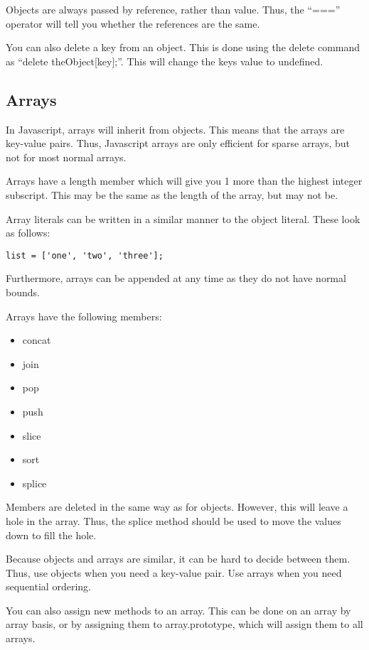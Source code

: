 			Objects are always passed by reference, rather than value. 
			Thus, the ``==='' operator will tell you whether the references are the same. 

			You can also delete a key from an object. 
			This is done using the delete command as ``delete theObject[key];''. 
			This will change the keys value to undefined. 
		\subsection{Arrays}
			In Javascript, arrays will inherit from objects. 
			This means that the arrays are key-value pairs. 
			Thus, Javascript arrays are only efficient for sparse arrays, but not for most normal arrays. 

			Arrays have a length member which will give you 1 more than the highest integer subscript. 
			This may be the same as the length of the array, but may not be. 

			Array literals can be written in a similar manner to the object literal. 
			These look as follows:
			\begin{verbatim}
list = ['one', 'two', 'three'];
			\end{verbatim}
			Furthermore, arrays can be appended at any time as they do not have normal bounds. 

			Arrays have the following members:
			\begin{itemize}
				\item concat
				\item join
				\item pop
				\item push 
				\item slice
				\item sort
				\item splice
			\end{itemize}

			Members are deleted in the same way as for objects. 
			However, this will leave a hole in the array. 
			Thus, the splice method should be used to move the values down to fill the hole. 

			Because objects and arrays are similar, it can be hard to decide between them. 
			Thus, use objects when you need a key-value pair. 
			Use arrays when you need sequential ordering. 

			You can also assign new methods to an array. 
			This can be done on an array by array basis, or by assigning them to array.prototype, 
			which will assign them to all arrays. 
